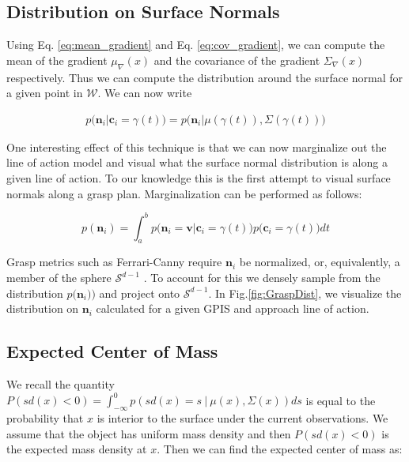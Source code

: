 \documentclass[letterpaper, 10 pt, conference]{ieeeconf}  %
\begin{document}
\subsection{Distribution on Surface Normals}\label{sec:normals} 
Using Eq. \ref{eq:mean_gradient} and Eq. \ref{eq:cov_gradient}, we can compute the mean of the gradient $ \mu_{\nabla}(x)$ and the covariance of the gradient $\Sigma_{\nabla}(x)$ respectively. Thus we can compute the distribution around the surface normal for a given point in $\mathcal{W}$. We can now write 

\vspace{-2ex}
\begin{align*}
p\big(\textbf{n}_i|\textbf{c}_i = \gamma(t)\big) = p\big(\textbf{n}_i |\mu(\gamma(t)), \Sigma(\gamma(t)) \big)
\end{align*}

One interesting effect of this technique is that we can now marginalize out the line of action model and visual what the surface normal distribution is along a given line of action. To our knowledge this is the first attempt to visual surface normals along a grasp plan. Marginalization can be performed as follows:

\vspace{-2ex}
\begin{equation}
    p(\textbf{n}_i ) = \int_a^b   p\big(\textbf{n}_i = \textbf{v} | \textbf{c}_i = \gamma(t) \big)p\big(\textbf{c}_i = \gamma(t)\big) dt \label{eq:normal_dist}
\end{equation}

Grasp metrics such as  Ferrari-Canny require $\textbf{n}_i$ be normalized, or, equivalently, a member of the sphere $\mathcal{S}^{d-1}$ \cite{ferrari1992}. To account for this we densely sample from the  distribution $p \big(\textbf{n}_i ) \big)$  and project onto $\mathcal{S}^{d-1}$.  In Fig.\ref{fig:GraspDist}, we visualize the distribution on $\textbf{n}_i$ calculated for a given GPIS and approach line of action.


\subsection{Expected Center of Mass}\label{sec:mass} 

We recall the quantity $P(sd(x) < 0) = \int_{-\infty}^{0} p(sd(x) =  s \ | \ \mu(x),\Sigma(x)) ds$ is equal to the probability that $x$ is interior to the surface under the current observations.
We assume that the object has uniform mass density and then $P(sd(x) < 0)$ is the expected mass density at $x$.
Then we can find the expected center of mass as:
\end{document}
